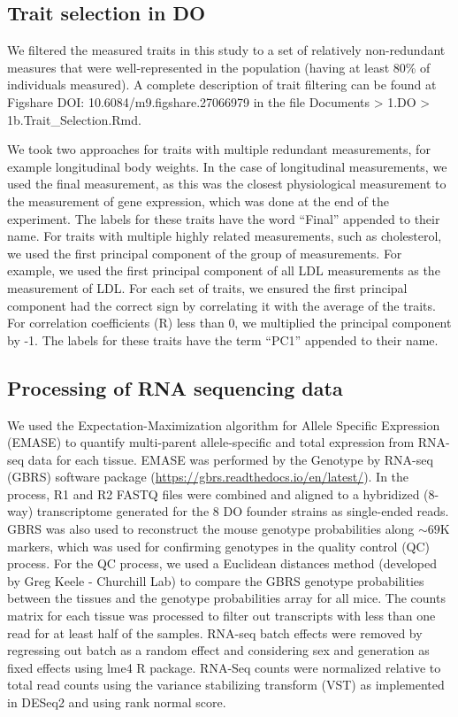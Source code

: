 \documentclass[
]{article}
\begin{document}
\subsection{Trait selection in DO}\label{trait-selection-in-do}

We filtered the measured traits in this study to a set of relatively
non-redundant measures that were well-represented in the population
(having at least 80\% of individuals measured). A complete description
of trait filtering can be found at Figshare DOI:
10.6084/m9.figshare.27066979 in the file Documents \textgreater{} 1.DO
\textgreater{} 1b.Trait\_Selection.Rmd.

We took two approaches for traits with multiple redundant measurements,
for example longitudinal body weights. In the case of longitudinal
measurements, we used the final measurement, as this was the closest
physiological measurement to the measurement of gene expression, which
was done at the end of the experiment. The labels for these traits have
the word ``Final'' appended to their name. For traits with multiple
highly related measurements, such as cholesterol, we used the first
principal component of the group of measurements. For example, we used
the first principal component of all LDL measurements as the measurement
of LDL. For each set of traits, we ensured the first principal component
had the correct sign by correlating it with the average of the traits.
For correlation coefficients (R) less than 0, we multiplied the
principal component by -1. The labels for these traits have the term
``PC1'' appended to their name.

\subsection{Processing of RNA sequencing
data}\label{processing-of-rna-sequencing-data}

We used the Expectation-Maximization algorithm for Allele Specific
Expression (EMASE) \cite{pmid29444201, pmid25236449} to quantify
multi-parent allele-specific and total expression from RNA-seq data for
each tissue. EMASE was performed by the Genotype by RNA-seq (GBRS)
software package (\url{https://gbrs.readthedocs.io/en/latest/}). In the
process, R1 and R2 FASTQ files were combined and aligned to a hybridized
(8-way) transcriptome generated for the 8 DO founder strains as
single-ended reads. GBRS was also used to reconstruct the mouse genotype
probabilities along \(\sim69\)K markers, which was used for confirming
genotypes in the quality control (QC) process. For the QC process, we
used a Euclidean distances method (developed by Greg Keele - Churchill
Lab) to compare the GBRS genotype probabilities between the tissues and
the genotype probabilities array for all mice. The counts matrix for
each tissue was processed to filter out transcripts with less than one
read for at least half of the samples. RNA-seq batch effects were
removed by regressing out batch as a random effect and considering sex
and generation as fixed effects using lme4 R package. RNA-Seq counts
were normalized relative to total read counts using the variance
stabilizing transform (VST) as implemented in DESeq2 and using rank
normal score.
\end{document}
